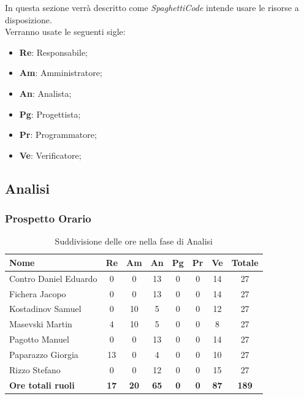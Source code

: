 \documentclass[../piano_di_progetto.tex]{subfiles}
\begin{document}
In questa sezione verrà descritto come \emph{SpaghettiCode} intende usare le risorse a disposizione. \\
Verranno usate le seguenti sigle:\par
\begin{itemize}
\item \textbf{Re}: Responsabile;
\item \textbf{Am}: Amministratore;
\item \textbf{An}: Analista;
\item \textbf{Pg}: Progettista;
\item \textbf{Pr}: Programmatore;
\item \textbf{Ve}: Verificatore;
\end{itemize}

\subsection{Analisi}%
\label{sub:fase_analisi}
\subsubsection{Prospetto Orario}

\begin{table}[!ht]
	\centering
	\begin{tabular}{|l|c|c|c|c|c|c|c|}
	\hline
	\rowcolor{lightgray}
	\textbf{Nome} & \textbf{Re} & \textbf{Am} & \textbf{An} & \textbf{Pg}  & \textbf{Pr}   & \textbf{Ve} & \textbf{Totale}\\
	\hline
		Contro Daniel Eduardo & 0 & 0 & 13 & 0 & 0 & 14 & 27 \\
		Fichera Jacopo & 0 & 0 & 13 & 0 & 0 & 14 & 27 \\
		Kostadinov Samuel & 0 & 10 & 5 & 0 & 0 & 12 & 27 \\			
		Masevski Martin & 4 & 10 & 5 & 0 & 0 & 8 & 27 \\
		Pagotto Manuel & 0 & 0 & 13 & 0 & 0 & 14 & 27 \\			
		Paparazzo Giorgia & 13 & 0 & 4 & 0 & 0 & 10 & 27 \\
		Rizzo Stefano & 0 & 0 & 12 & 0 & 0 & 15 & 27 \\
		\hline
		\textbf{Ore totali ruoli} & \textbf{17} & \textbf{20} & \textbf{65} & \textbf{0} & \textbf{0} & \textbf{87} & \textbf{189} \\
	\hline	
	\end{tabular}
	\caption{Suddivisione delle ore nella fase di Analisi}
\end{table}
\end{document}
